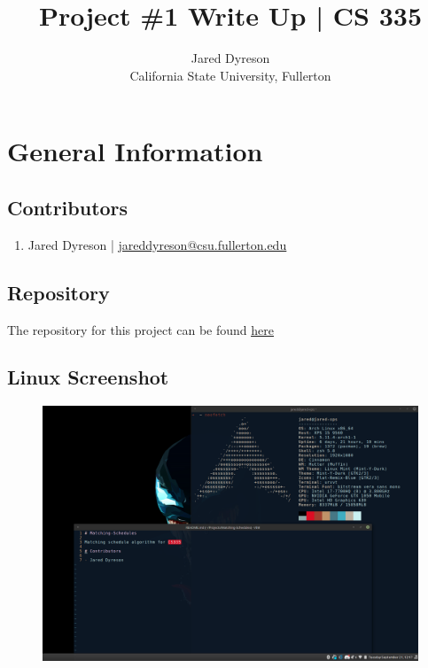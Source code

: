 \documentclass{article}
\title{Project \#1 Write Up | CS 335}
\author{Jared Dyreson\\ 
        California State University, Fullerton}
\begin{document}
\maketitle
\tableofcontents

\newpage

\section{General Information}

\subsection{Contributors}

\begin{enumerate}
\item Jared Dyreson | \href{mailto:jareddyreson@csu.fullerton.edu}{\underline{jareddyreson@csu.fullerton.edu}}
\end{enumerate}

\subsection{Repository}

The repository for this project can be found \href{https://github.com/JaredDyreson/Matching-Schedules}{\underline{here}}

\subsection{Linux Screenshot}

\begin{figure}[!h]
\centering
\includegraphics[width=16cm]{arch_linux}
\end{figure}
\end{document}
